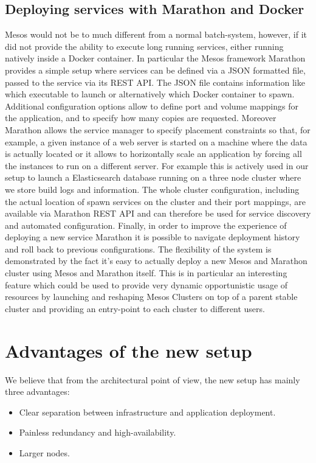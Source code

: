 \documentclass[a4paper]{jpconf}
\begin{document}
\subsection{Deploying services with Marathon and Docker}

Mesos would not be to much different from a normal batch-system, however, if it
did not provide the ability to execute long running services, either running
natively inside a Docker container. In particular the Mesos framework Marathon
provides a simple setup where services can be defined via a JSON formatted file,
passed to the service via its REST API. The JSON file contains information like
which executable to launch or alternatively which Docker container to spawn.
Additional configuration options allow to define port and volume mappings for
the application, and to specify how many copies are requested. Moreover Marathon
allows the service manager to specify placement constraints so that, for
example, a given instance of a web server is started on a machine where the data
is actually located or it allows to horizontally scale an application by forcing
all the instances to run on a different server. For example this is actively
used in our setup to launch a Elasticsearch database running on a three node
cluster where we store build logs and information. The whole cluster
configuration, including the actual location of spawn services on the cluster
and their port mappings, are available via Marathon REST API and can therefore
be used for service discovery and automated configuration. Finally, in order to
improve the experience of deploying a new service Marathon it is possible to
navigate deployment history and roll back to previous configurations. The
flexibility of the system is demonstrated by the fact it's easy to actually
deploy a new Mesos and Marathon cluster using Mesos and Marathon itself. This is
in particular an interesting feature which could be used to provide very dynamic
opportunistic usage of resources by launching and reshaping Mesos Clusters on
top of a parent stable cluster and providing an entry-point to each cluster to
different users.

\section{Advantages of the new setup}

We believe that from the architectural point of view, the new setup has mainly
three advantages:

\begin{itemize}

\item Clear separation between infrastructure and application deployment.

\item Painless redundancy and high-availability.

\item Larger nodes.

\end{itemize}
\end{document}
